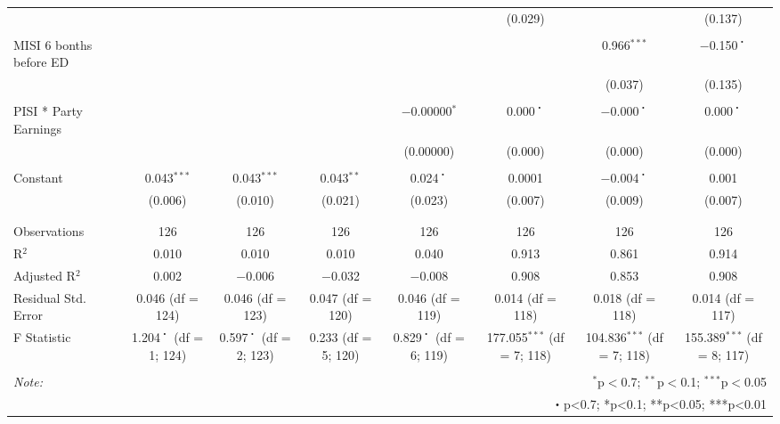 \begin{table}[!htbp]
\begin{tabular}{@{\extracolsep{5pt}}lccccccc}
  &  &  &  &  & (0.029) &  & (0.137) \\ 
  & & & & & & & \\ 
 MISI 6 bonths before ED &  &  &  &  &  & 0.966$^{***}$ & $-$0.150$^{・}$ \\ 
  &  &  &  &  &  & (0.037) & (0.135) \\ 
  & & & & & & & \\ 
 PISI * Party Earnings &  &  &  & $-$0.00000$^{*}$ & 0.000$^{・}$ & $-$0.000$^{・}$ & 0.000$^{・}$ \\ 
  &  &  &  & (0.00000) & (0.000) & (0.000) & (0.000) \\ 
  & & & & & & & \\ 
 Constant & 0.043$^{***}$ & 0.043$^{***}$ & 0.043$^{**}$ & 0.024$^{・}$ & 0.0001 & $-$0.004$^{・}$ & 0.001 \\ 
  & (0.006) & (0.010) & (0.021) & (0.023) & (0.007) & (0.009) & (0.007) \\ 
  & & & & & & & \\ 
\hline \\[-1.8ex] 
Observations & 126 & 126 & 126 & 126 & 126 & 126 & 126 \\ 
R$^{2}$ & 0.010 & 0.010 & 0.010 & 0.040 & 0.913 & 0.861 & 0.914 \\ 
Adjusted R$^{2}$ & 0.002 & $-$0.006 & $-$0.032 & $-$0.008 & 0.908 & 0.853 & 0.908 \\ 
Residual Std. Error & 0.046 (df = 124) & 0.046 (df = 123) & 0.047 (df = 120) & 0.046 (df = 119) & 0.014 (df = 118) & 0.018 (df = 118) & 0.014 (df = 117) \\ 
F Statistic & 1.204$^{・}$ (df = 1; 124) & 0.597$^{・}$ (df = 2; 123) & 0.233 (df = 5; 120) & 0.829$^{・}$ (df = 6; 119) & 177.055$^{***}$ (df = 7; 118) & 104.836$^{***}$ (df = 7; 118) & 155.389$^{***}$ (df = 8; 117) \\ 
\hline 
\hline \\[-1.8ex] 
\textit{Note:}  & \multicolumn{7}{r}{$^{*}$p$<$0.7; $^{**}$p$<$0.1; $^{***}$p$<$0.05} \\ 
 & \multicolumn{7}{r}{・p<0.7; *p<0.1; **p<0.05; ***p<0.01} \\ 
\end{tabular} 
\end{table} 
